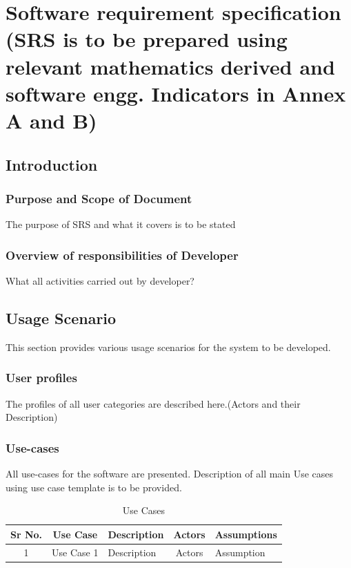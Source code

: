 \documentclass[oneside,a4paper,12pt]{report}
\begin{document}
\chapter{Software requirement specification  (SRS is to be prepared using relevant mathematics derived and software engg. Indicators in Annex A and B)}

\section{Introduction}
\subsection{Purpose and Scope of Document}
The purpose of SRS and what it covers is to be stated 

\subsection{Overview of responsibilities of Developer}
What all activities carried out by developer?
  
\section{Usage Scenario}
This section provides various usage scenarios for the system to be developed.  
 \subsection{User profiles}  
The profiles of all user categories are described here.(Actors and their Description)

\subsection{Use-cases}
All use-cases for the software are presented. Description of all main Use cases using use case template is to be provided.

\begin{table}[!htbp]
\begin{center}
\def\arraystretch{1.5}
\begin{tabularx}{\textwidth}{| c | c | X | c | X |}
\hline
Sr No.	& Use Case	& Description	& Actors	& Assumptions \\
\hline
1& Use Case 1 & Description & Actors & Assumption \\
\hline
\end{tabularx}
\end{center}
\caption{Use Cases}
\label{tab:usecase}
\end{table}
\end{document}
